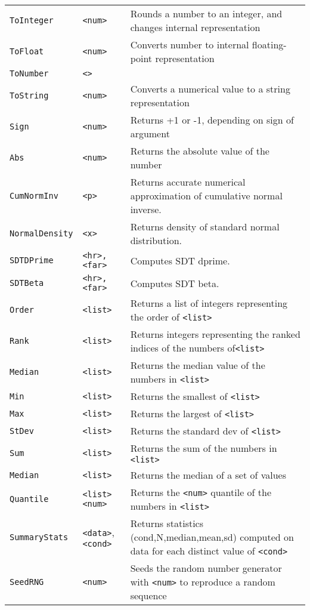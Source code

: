 \begin{longtable}{p{3cm}p{3cm}p{6cm}}
\verb+ToInteger+ &\verb+<num>+ &Rounds a number to an integer, and changes internal representation\\ 
\verb+ToFloat+ &\verb+<num>+ &Converts number to internal floating-point representation\\ 
\verb+ToNumber+ &\verb+<>+ & \\ 
\verb+ToString+ &\verb+<num>+ &Converts a numerical value to a string representation\\ 
\verb+Sign+ &\verb+<num>+ &Returns +1 or -1, depending on sign of argument\\ 
\verb+Abs+ &\verb+<num>+ &Returns the absolute value of the number\\ 
\verb+CumNormInv+&\verb+<p>+&Returns accurate numerical approximation of cumulative normal inverse.\\
\verb+NormalDensity+&\verb+<x>+&Returns density of standard normal distribution.\\
\verb+SDTDPrime+&\verb+<hr>,<far>+&Computes SDT dprime.\\
\verb+SDTBeta+&\verb+<hr>,<far>+&Computes SDT beta.\\
\verb+Order+ &\verb+<list>+ &Returns a list of integers representing the order of \verb+<list>+\\ 
\verb+Rank+ &\verb+<list>+ &Returns integers representing the ranked indices of the numbers of\verb+<list>+\\ 
\verb+Median+ &\verb+<list>+ &Returns the median value of the numbers in \verb+<list>+\\ 
\verb+Min+ &\verb+<list>+ &Returns the smallest of \verb+<list>+\\ 
\verb+Max+ &\verb+<list>+ &Returns the largest of \verb+<list>+\\ 
\verb+StDev+ &\verb+<list>+ &Returns the standard dev of \verb+<list>+ \\ 
\verb+Sum+ &\verb+<list>+ &Returns the sum of the numbers in \verb+<list>+\\ 
\verb+Median+ &\verb+<list>+ &Returns the median of a set of values \\ 
\verb+Quantile+ &\verb+<list> <num>+ &Returns the \verb+<num>+ quantile of the numbers in \verb+<list>+\\ 
\verb+SummaryStats+ &\verb+<data>+,\verb+<cond>+ &Returns statistics (cond,N,median,mean,sd) computed on data for each distinct value of \verb+<cond>+\\ 
\verb+SeedRNG+ &\verb+<num>+ &Seeds the random number generator with \verb+<num>+ to reproduce a random sequence\\ 

\end{longtable}
